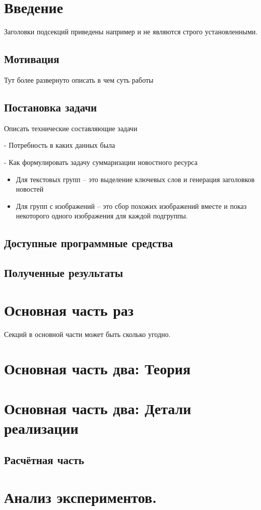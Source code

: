 \documentclass[aps,%
12pt,%
final,%
oneside,
onecolumn,%
musixtex, %
superscriptaddress,%
centertags]{article} %
\begin{document}
\section{Введение}
Заголовки подсекций приведены например и не являются строго установленными.
\subsection{Мотивация}
Тут более развернуто описать в чем суть работы
\subsection{Постановка задачи}
Описать технические составляющие задачи

- Потребность в каких данных была

- Как формулировать задачу суммаризации новостного ресурса
\begin{itemize}
  \item Для текстовых групп -- это выделение ключевых слов и генерация заголовков новостей
  \item Для групп с изображений -- это сбор похожих изображений вместе и показ некоторого
        одного изображения для каждой подгруппы.
\end{itemize}
\subsection{Доступные программные средства}
\subsection{Полученные результаты}

\section{Основная часть раз}
Секций в основной части может быть сколько угодно.

\section{Основная часть два: Теория}

\section{Основная часть два: Детали реализации}
\subsection{Расчётная часть}

\section{Анализ экспериментов.}



\end{document}
